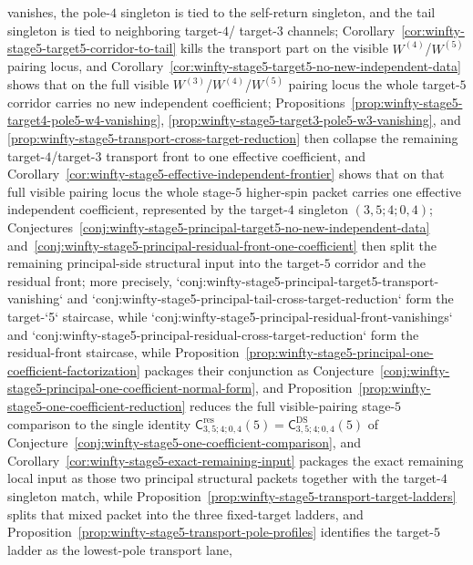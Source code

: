 \begin{proposition}
\begin{enumerate}[label=\textup{(\alph*)}]
  vanishes, the pole-$4$ singleton is tied to the self-return
  singleton, and the tail singleton is tied to neighboring target-$4$/
  target-$3$ channels; Corollary~\ref{cor:winfty-stage5-target5-corridor-to-tail}
  kills the transport part on the visible $W^{(4)}$/$W^{(5)}$ pairing
  locus, and
  Corollary~\ref{cor:winfty-stage5-target5-no-new-independent-data}
  shows that on the full visible
  $W^{(3)}$/$W^{(4)}$/$W^{(5)}$ pairing locus the whole target-$5$
  corridor carries no new independent coefficient; Propositions~\ref{prop:winfty-stage5-target4-pole5-w4-vanishing},
  \ref{prop:winfty-stage5-target3-pole5-w3-vanishing}, and
  \ref{prop:winfty-stage5-transport-cross-target-reduction} then
  collapse the remaining target-$4$/target-$3$ transport front to one
  effective coefficient, and
  Corollary~\ref{cor:winfty-stage5-effective-independent-frontier}
  shows that on that full visible pairing locus the whole stage-$5$
  higher-spin packet carries one effective independent coefficient,
  represented by the target-$4$ singleton \((3,5;4;0,4)\);
  Conjectures~\ref{conj:winfty-stage5-principal-target5-no-new-independent-data}
  and~\ref{conj:winfty-stage5-principal-residual-front-one-coefficient}
  then split the remaining principal-side structural input into the
  target-$5$ corridor and the residual front; more precisely,
  `conj:winfty-stage5-principal-target5-transport-vanishing` and
  `conj:winfty-stage5-principal-tail-cross-target-reduction` form the
  target-`5` staircase, while
  `conj:winfty-stage5-principal-residual-front-vanishings` and
  `conj:winfty-stage5-principal-residual-cross-target-reduction` form
  the residual-front staircase, while
  Proposition~\ref{prop:winfty-stage5-principal-one-coefficient-factorization}
  packages their conjunction as
  Conjecture~\ref{conj:winfty-stage5-principal-one-coefficient-normal-form}, and
  Proposition~\ref{prop:winfty-stage5-one-coefficient-reduction}
  reduces the full visible-pairing stage-$5$ comparison to the single
  identity
  \(
  \mathsf{C}^{\mathrm{res}}_{3,5;4;0,4}(5)
  =
  \mathsf{C}^{\mathrm{DS}}_{3,5;4;0,4}(5)
  \)
  of Conjecture~\ref{conj:winfty-stage5-one-coefficient-comparison}, and
  Corollary~\ref{cor:winfty-stage5-exact-remaining-input} packages the
  exact remaining local input as those two principal structural packets
  together with the target-$4$ singleton match,
  while
  Proposition~\ref{prop:winfty-stage5-transport-target-ladders}
  splits that mixed packet into the three fixed-target ladders, and
  Proposition~\ref{prop:winfty-stage5-transport-pole-profiles}
  identifies the target-$5$ ladder as the lowest-pole transport lane,

\end{enumerate}
\end{proposition}

